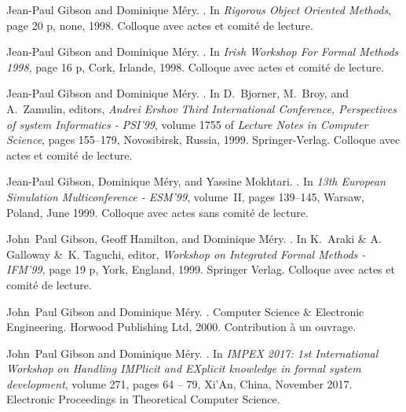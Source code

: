 \documentclass[ 12pt]{article}
\begin{document}
\begin{thebibliography}{100}
Jean-Paul Gibson and Dominique M{\'e}ry.
.
\newblock In {\em {Rigorous Object Oriented Methods}}, page 20 p, none, 1998.
\newblock Colloque avec actes et comit{\'e} de lecture.

Jean-Paul Gibson and Dominique M{\'e}ry.
.
\newblock In {\em {Irish Workshop For Formal Methods 1998}}, page 16 p, Cork,
  Irlande, 1998.
\newblock Colloque avec actes et comit{\'e} de lecture.

Jean-Paul Gibson and Dominique M{\'e}ry.
.
\newblock In D.~Bjorner, M.~Broy, and A.~Zamulin, editors, {\em {Andrei Ershov
  Third International Conference, Perspectives of system Informatics -
  PSI'99}}, volume 1755 of {\em Lecture Notes in Computer Science}, pages
  155--179, Novosibirsk, Russia, 1999. {Springer-Verlag}.
\newblock Colloque avec actes et comit{\'e} de lecture.

Jean-Paul Gibson, Dominique M{\'e}ry, and Yassine Mokhtari.
.
\newblock In {\em {13th European Simulation Multiconference - ESM'99}},
  volume~II, pages 139--145, Warsaw, Poland, June 1999.
\newblock Colloque avec actes sans comit{\'e} de lecture.

John~Paul Gibson, Geoff Hamilton, and Dominique M{\'e}ry.
.
\newblock In K.~Araki \& A. Galloway \&~K. Taguchi, editor, {\em {Workshop on
  Integrated Formal Methods - IFM'99}}, page 19 p, York, England, 1999.
  {Springer Verlag}.
\newblock Colloque avec actes et comit{\'e} de lecture.

John~Paul Gibson and Dominique M{\'e}ry.
.
\newblock Computer Science \& Electronic Engineering. {Horwood Publishing Ltd},
  2000.
\newblock Contribution {\`a} un ouvrage.

John~Paul Gibson and Dominique M{\'e}ry.
.
\newblock In {\em {IMPEX 2017: 1st International Workshop on Handling IMPlicit
  and EXplicit knowledge in formal system development}}, volume 271, pages 64
  -- 79, Xi’An, China, November 2017. {Electronic Proceedings in Theoretical
  Computer Science}.


\end{thebibliography}
\end{document}
